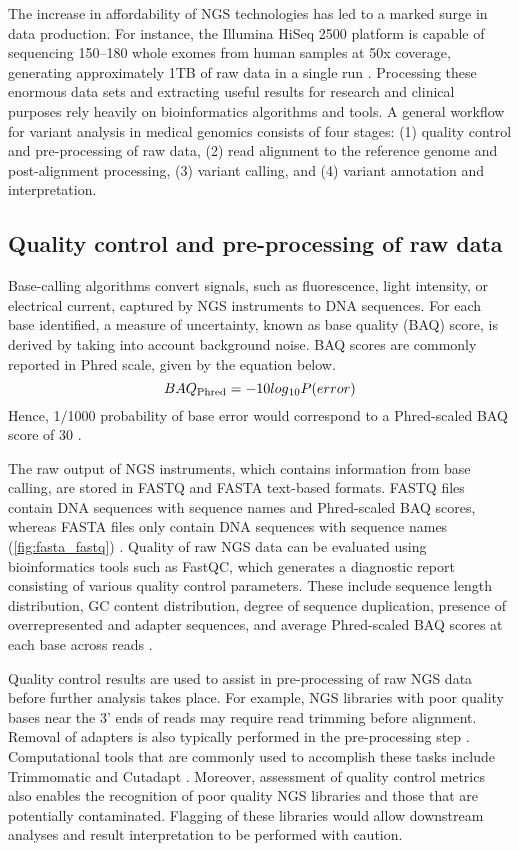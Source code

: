 The increase in affordability of NGS technologies has led to a marked surge in data production. For instance, the Illumina HiSeq 2500 platform is capable of sequencing 150--180 whole exomes from human samples at 50x coverage, generating approximately 1TB of raw data in a single run \cite{Dong2015}. Processing these enormous data sets and extracting useful results for research and clinical purposes rely heavily on bioinformatics algorithms and tools. A general workflow for variant analysis in medical genomics consists of four stages: (1) quality control and pre-processing of raw data, (2) read alignment to the reference genome and post-alignment processing, (3) variant calling, and (4) variant annotation and interpretation.

\subsection{Quality control and pre-processing of raw data}

Base-calling algorithms convert signals, such as fluorescence, light intensity, or electrical current, captured by NGS instruments to DNA sequences. For each base identified, a measure of uncertainty, known as base quality (\acs{BAQ}) score, is derived by taking into account background noise. BAQ scores are commonly reported in Phred scale, given by the equation below. $$BAQ\textsubscript{Phred} = -10log\textsubscript{10}P(error)$$ Hence, 1$/$1000 probability of base error would correspond to a Phred-scaled BAQ score of 30 \cite{Nielsen2011a, Ledergerber2011}.

The raw output of NGS instruments, which contains information from base calling, are stored in FASTQ and FASTA text-based formats. FASTQ files contain DNA sequences with sequence names and Phred-scaled BAQ scores, whereas FASTA files only contain DNA sequences with sequence names (\autoref{fig:fasta_fastq}) \cite{Bao2014, Mielczarek2016}. Quality of raw NGS data can be evaluated using bioinformatics tools such as FastQC, which generates a diagnostic report consisting of various quality control parameters. These include sequence length distribution, GC content distribution, degree of sequence duplication, presence of overrepresented and adapter sequences, and average Phred-scaled BAQ scores at each base across reads \cite{Andrews2017}.

Quality control results are used to assist in pre-processing of raw NGS data before further analysis takes place. For example, NGS libraries with poor quality bases near the 3' ends of reads may require read trimming before alignment. Removal of adapters is also typically performed in the pre-processing step \cite{Bao2014}. Computational tools that are commonly used to accomplish these tasks include Trimmomatic \cite{Bolger2014} and Cutadapt \cite{Marcel2011}. Moreover, assessment of quality control metrics also enables the recognition of poor quality NGS libraries and those that are potentially contaminated. Flagging of these libraries would allow downstream analyses and result interpretation to be performed with caution.

